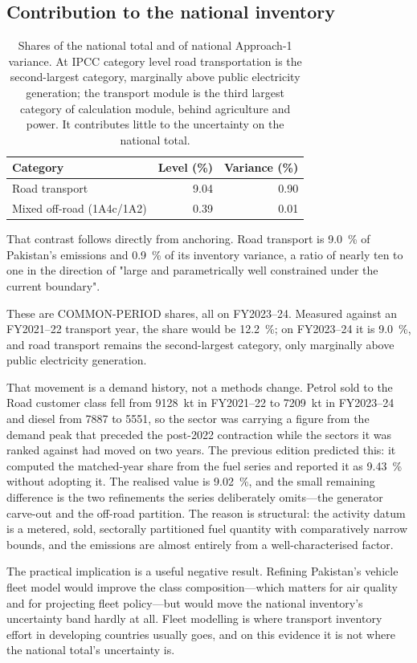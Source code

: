 \subsection{Contribution to the national inventory}

\begin{table}[htbp]
\centering
\footnotesize
\begin{tabular}{@{}lrr@{}}
\toprule
\textbf{Category} & \textbf{Level (\%)} & \textbf{Variance (\%)} \\
\midrule
Road transport            &  9.04 & 0.90 \\
Mixed off-road (1A4c/1A2) &  0.39 & 0.01 \\
\bottomrule
\end{tabular}
\caption{Shares of the national total and of national Approach-1 variance. At IPCC category level road transportation is the
second-largest category, marginally above public electricity generation; the transport module is
the third largest category of calculation module, behind agriculture and power. It contributes
little to the uncertainty on the national total.}
\label{tab:keycat}
\end{table}

That contrast follows directly from anchoring. Road transport is \SI{9.0}{\percent} of Pakistan's emissions and
\SI{0.9}{\percent} of its inventory variance, a ratio of nearly ten to one in the
direction of "large and parametrically well constrained under the current boundary".

These are COMMON-PERIOD shares, all on FY2023--24. Measured against an FY2021--22 transport year,
the share would be \SI{12.2}{\percent}; on FY2023--24 it is \SI{9.0}{\percent}, and road transport remains
the second-largest category, only marginally above public electricity generation.

That movement is a demand history, not a methods change. Petrol sold to the Road customer
class fell from \SI{9128}{\kilo\tonne} in FY2021--22 to \SI{7209}{\kilo\tonne} in FY2023--24
and diesel from \SI{7887}{} to \SI{5551}{}, so the sector was carrying a figure from the
demand peak that preceded the post-2022 contraction while the sectors it was ranked against
had moved on two years. The previous edition predicted this: it computed the matched-year
share from the fuel series and reported it as \SI{9.43}{\percent} without adopting it. The
realised value is \SI{9.02}{\percent}, and the small remaining difference is the two
refinements the series deliberately omits---the generator carve-out and the off-road
partition.
The reason is structural: the activity datum is a metered, sold, sectorally partitioned
fuel quantity with comparatively narrow bounds, and the emissions are almost entirely
\COtwo{} from a well-characterised factor.

The practical implication is a useful negative result. Refining Pakistan's vehicle fleet model
would improve the class composition---which matters for air quality and for projecting fleet
policy---but would move the national inventory's uncertainty band hardly at all. Fleet
modelling is where transport inventory effort in developing countries usually goes, and on
this evidence it is not where the national total's uncertainty is.
